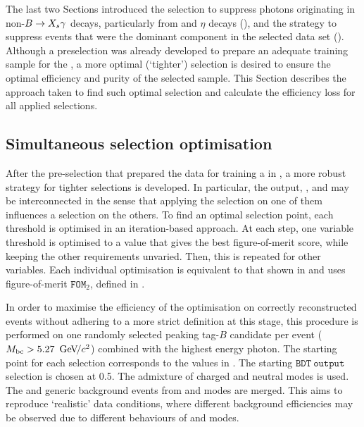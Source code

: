 The last two Sections introduced the selection to suppress photons originating in non-\mbox{$\BtoXsgamma$} decays, particularly from \piz and $\eta$ decays (),
and the strategy to suppress \mbox{\epem\ra\qqbar} events that were the dominant component in the selected data set ().
Although a preselection was already developed to prepare an adequate training sample for the \BDT, a more optimal (`tighter') selection is desired to ensure the optimal efficiency and purity of the selected sample.
This Section describes the approach taken to find such optimal selection and calculate the efficiency loss for all applied selections.

\subsection{Simultaneous selection optimisation}\label{sec:simultaneous_optimisation}

After the pre-selection that prepared the data for training a \BDT in , a more robust strategy for tighter selections is developed.
In particular, the \BDT output, \piVeto, \etaVeto and \ZMVA may be interconnected in the sense that applying the selection on one of them influences a selection on the others. 
To find an optimal selection point, each threshold is optimised in an iteration-based approach. 
At each step, one variable threshold is optimised to a value that gives the best figure-of-merit score,
while keeping the other requirements unvaried.
Then, this is repeated for other variables.
Each individual optimisation is equivalent to that shown in  and uses figure-of-merit $\mathtt{FOM}_2$, defined in .

In order to maximise the efficiency of the optimisation on correctly reconstructed events without adhering to a more strict definition at this stage, 
this procedure is performed on one randomly selected peaking tag-$B$ candidate per event (${M_{\mathrm{bc}}} >5.27~{\mathrm{\,Ge\kern -0.1em V\!/}c^2}$) combined with the highest energy photon.
The starting point for each selection corresponds to the values in .
The starting $\mathtt{BDT~output}$ selection is chosen at 0.5. 
The \BtoXsgamma admixture of charged and neutral modes is used.
The \epem\ra\qqbar and generic \BB background events from \feiBp and \feiBz modes are merged.
This aims to reproduce `realistic' data conditions, where different background efficiencies may be observed due to different behaviours of \feiBp and \feiBz modes.

